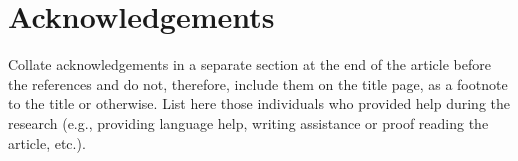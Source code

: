 \documentclass[twocolumn,3p,times,procedia]{elsarticle}
\begin{document}
\section*{Acknowledgements}
Collate acknowledgements in a separate section at the end of the article before the references and do not, therefore, include them on the title page, as a footnote to the title or otherwise. List here those individuals who provided help during the research (e.g., providing language help, writing assistance or proof reading the article, etc.).

%





\balance

~~~\\
~~~\\

\end{document}
